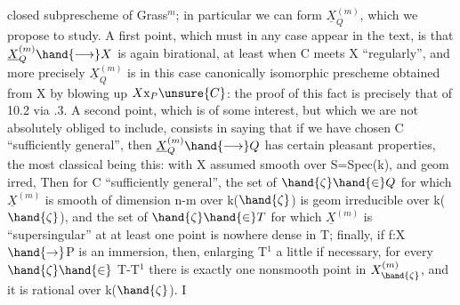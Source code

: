 
closed subprescheme of Grass$^{m}$; in particular we can form $\underline{X}^{(m)}_{Q}$,
which we propose to study. A first point, which must in any
case appear in the text, is that $\underline{X}^{(m)}_{Q} \hand{\longrightarrow} X$ is again birational,
at least when C meets X “regularly”, and more precisely $\underline{X}^{(m)}_{Q}$
is in this case canonically isomorphic  prescheme obtained from X by
blowing up $X\mathrm{x}_{P}\unsure{C}$: the proof of this fact is precisely that
of 10.2 via .3. A second point, which is of some interest,
but which we are not absolutely obliged to include, consists in
saying that if we have chosen C “sufficiently general”, then $\underline{X}^{(m)}_{Q} \hand{\longrightarrow} Q$ has certain
pleasant properties, the most classical being this: with X
assumed smooth over S=Spec(k), and  geom irred, Then for C “sufficiently
general”, the set of $\hand{\zeta}\hand{\in} Q$ for which $\underline{X}^{(m)}$ is smooth of dimension
n-m over k($\hand{\zeta}$) is geom irreducible over k($\hand{\zeta}$), and 
the set of $\hand{\zeta}\hand{\in} T$ for which $\underline{X}^{(m)}$ is “supersingular” at at
least one point is nowhere dense in T;
 finally, if f:X$\hand{\rightarrow}$P is an immersion, then,
enlarging T$^{1}$ a little if necessary, for every $\hand{\zeta}\hand{\in}$ T-T$^{1}$ there is exactly one
nonsmooth point in $X^{(m)}_{\hand{\zeta}}$, and it is rational over k($\hand{\zeta}$). I
